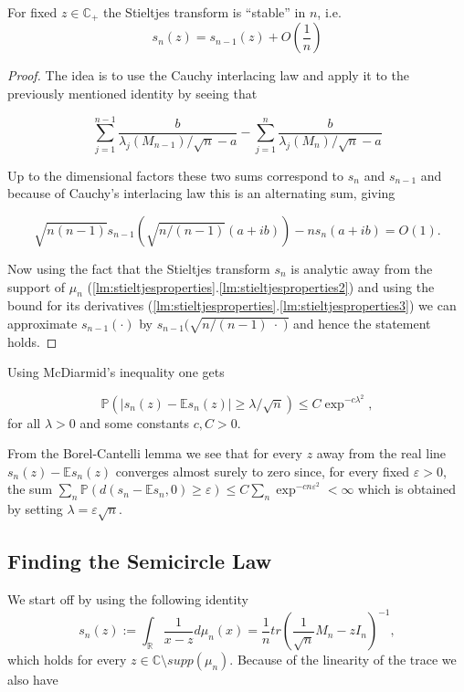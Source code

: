 \begin{lemma}
	For fixed $z\in\mathbb C_+$ the Stieltjes transform is ``stable'' in $n$, i.e.
	\begin{equation*}
		s_n(z)=s_{n-1}(z)+O\left(\frac{1}{n}\right)
	\end{equation*}
\end{lemma}
\begin{proof}
	The idea is to use the Cauchy interlacing law and apply it to the previously mentioned identity by seeing that
	
	$$\sum_{j=1}^{n-1}\frac{b}{\lambda_j(M_{n-1})/\sqrt{n}-a}-\sum_{j=1}^n\frac{b}{\lambda_j(M_n)/\sqrt{n}-a}$$
	
	Up to the dimensional factors these two sums correspond to $s_n$ and $s_{n-1}$ and because of Cauchy's interlacing law this is an alternating sum, giving
	
	$$\sqrt{n(n-1)}s_{n-1}(\sqrt{n/(n-1)}(a+ib))-ns_n(a+ib)=O(1).$$
	
	Now using the fact that the Stieltjes transform $s_n$ is analytic away from the support of $\mu_n$ (\ref{lm:stieltjesproperties}.\ref{lm:stieltjesproperties2}) and using the bound for its derivatives (\ref{lm:stieltjesproperties}.\ref{lm:stieltjesproperties3}) we can approximate $s_{n-1}(\cdot)$ by $s_{n-1}(\sqrt{n/(n-1) \;\cdot\; )}$ and hence the statement holds.
\end{proof}

Using McDiarmid's inequality one gets 

\begin{equation}\label{eq:concentrationOfStieltjesTransform}
	\mathbb P(|s_n(z)-\mathbb Es_n(z)|\geq\lambda/\sqrt n)\leq C\exp^{-c\lambda^2},
\end{equation}
 for all $\lambda>0$ and some constants $c,C>0$.

From the Borel-Cantelli lemma we see that for every $z$ away from the real line $s_n(z)-\mathbb Es_n(z)$ converges almost surely to zero since, for every fixed $\varepsilon>0$, the sum $\sum_n \mathbb P(d(s_n-\mathbb Es_n,0)\geq\varepsilon) \leq C\sum_n\exp^{-cn\varepsilon^2}<\infty$ which is obtained by setting $\lambda=\varepsilon\sqrt n$.

\subsection{Finding the Semicircle Law}

We start off by using the following identity $$s_n(z) := \int_\mathbb{R}\frac{1}{x-z}d\mu_n(x) = \frac{1}{n}tr\left(\frac{1}{\sqrt n}M_n-zI_n\right)^{-1},$$ which holds for every $z\in\mathbb C\setminus supp(\mu_n)$. Because of the linearity of the trace we also have

